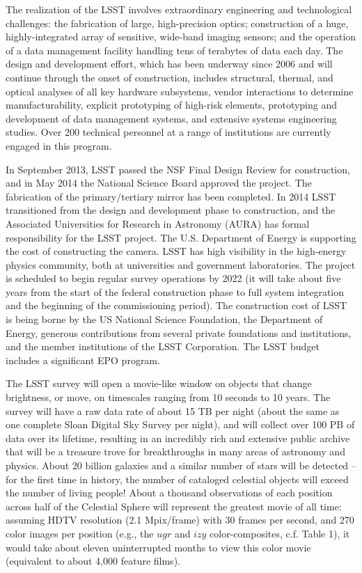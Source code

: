 \documentclass{emulateapj}
\begin{document}
The realization of the LSST involves extraordinary engineering and 
technological challenges: the fabrication of large, high-precision optics; 
construction of a huge, highly-integrated array of sensitive, wide-band 
imaging sensors; and the operation of a data management facility 
handling tens of terabytes of data each day. The design and development 
effort, which has been underway since 2006 and will continue through the 
onset of construction, includes structural, thermal, and optical analyses 
of all key hardware subsystems, vendor interactions to determine 
manufacturability, explicit prototyping of high-risk elements, prototyping 
and development of data management systems, and extensive systems engineering 
studies. Over 200 technical personnel at a range of institutions are currently 
engaged in this program. 

In September 2013, LSST passed the NSF Final Design Review for construction, 
and in May 2014 the National Science Board approved the project.  
The fabrication of the primary/tertiary mirror has been completed. 
In 2014 LSST transitioned from the design and development phase to
construction, and the Associated Universities for Research in
Astronomy (AURA) has formal responsibility for the LSST project.  
The U.S. Department of Energy is supporting the cost of constructing the 
camera. LSST has high visibility in the high-energy physics community,
both at universities and government laboratories. The project is scheduled to 
begin regular survey operations by 2022
(it will take about five years from the start of the federal construction phase
to full system integration and the beginning of the commissioning period). 
The construction cost of LSST is being borne by the US National Science
Foundation, the Department of Energy, generous contributions from several 
private foundations and institutions, and the member institutions of the 
LSST Corporation. The LSST budget includes a significant EPO program. 

The LSST survey will open a movie-like window on objects that 
change brightness, or move, on timescales ranging from 10 seconds to 10 years.
The survey will have a raw data rate of about 15 TB per night (about the same as one
complete Sloan Digital Sky Survey per night), and will collect over 100 PB
of data over its lifetime, resulting in an incredibly rich and extensive
public archive that will be a treasure trove for breakthroughs in many areas 
of astronomy and physics. About 20 billion galaxies and a similar number of stars
will be detected -- for the first time in history, the number of cataloged 
celestial objects will exceed the number of living people! About a thousand
observations of each position across half of the Celestial Sphere will
represent the greatest movie of all time: assuming HDTV resolution (2.1
Mpix/frame) with 30 frames per second, and 270 color images per position
(e.g., the $ugr$ and $izy$ color-composites, c.f. Table 1), it would take 
about eleven uninterrupted months to view this color movie (equivalent
to about 4,000 feature films). 
\end{document}
